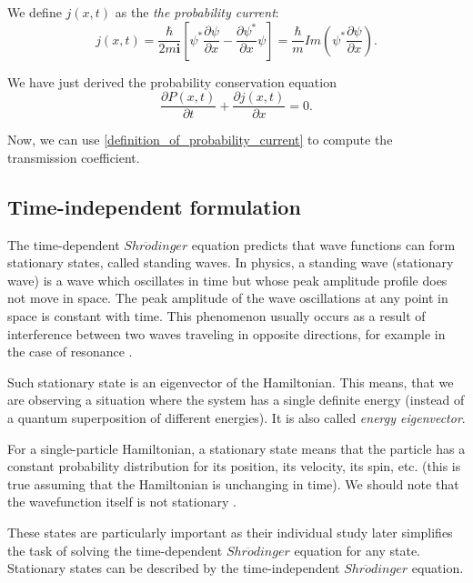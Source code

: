\documentclass[12pt,a4paper,onecolumn]{article}
\theoremstyle{definition}
\theoremstyle{plain}
\begin{document}
     We define $j(x,t)$ as the \textit{the probability current}:
    \begin{equation}
    \label{definition_of_probability_current}
    j(x,t) =  \frac{\hbar}{2m\textbf{i}}
    \left[
    \psi^{*} \frac{\partial \psi}{\partial  x} -
    \frac{\partial \psi^{*}}{\partial  x} \psi 
    \right]=
    \frac{\hbar}{m}
    Im\left(
    \psi^{*} \frac{\partial \psi}{\partial  x} 
    \right).
    \end{equation}
    
    We have just derived the probability conservation equation
    \begin{equation}
            \frac{\partial P(x,t)}{\partial t} + \frac{\partial j(x,t)}{\partial x} = 0.
    \end{equation}

Now, we can use \eqref{definition_of_probability_current} to compute the transmission coefficient.

\subsection{Time-independent formulation}
The time-dependent $Shr\ddot{o}dinger$ equation predicts that wave functions can form stationary states, called standing waves.
In physics, a standing wave (stationary wave) is a wave which oscillates in time but whose peak amplitude profile does not move in space. The peak amplitude of the wave oscillations at any point in space is constant with time. This phenomenon usually occurs as a result of interference between two waves traveling in opposite directions, for example in the case of resonance \cite{wikiStatState}.

Such stationary state is an eigenvector of the Hamiltonian. This means, that we are observing a situation where the system has a single definite energy (instead of a quantum superposition of different energies). It is also called \textit{energy eigenvector}.

For a single-particle Hamiltonian, a stationary state means that the particle has a constant probability distribution for its position, its velocity, its spin, etc. (this is true assuming that the Hamiltonian is unchanging in time). We should note that the wavefunction itself is not stationary \cite{wikiStatState}.


These states are particularly important as their individual study later simplifies the task of solving the time-dependent $Shr\ddot{o}dinger$ equation for any state. Stationary states can be described by the time-independent $Shr\ddot{o}dinger$ equation. \\
\end{document}
